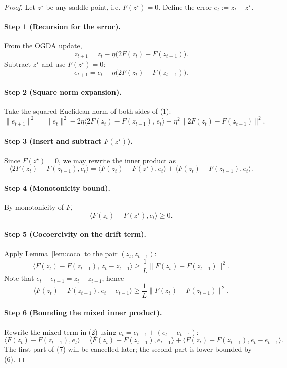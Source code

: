 \documentclass{article}
\begin{document}
\begin{proof}
Let $z^\star$ be any saddle point, i.e. $F(z^\star)=0$.  Define the error $e_t:=z_t-z^\star$.

\paragraph{Step 1 (Recursion for the error).}
From the OGDA update,
\[
z_{t+1}=z_t-\eta\bigl(2F(z_t)-F(z_{t-1})\bigr).
\]
Subtract $z^\star$ and use $F(z^\star)=0$:
\[
e_{t+1}=e_t-\eta\bigl(2F(z_t)-F(z_{t-1})\bigr).
\tag{1}
\]

\paragraph{Step 2 (Square norm expansion).}
Take the squared Euclidean norm of both sides of (1):
\[
\|e_{t+1}\|^2
= \|e_t\|^2-2\eta\bigl\langle 2F(z_t)-F(z_{t-1}),\,e_t\bigr\rangle
+\eta^2\|2F(z_t)-F(z_{t-1})\|^2.
\tag{2}
\]

\paragraph{Step 3 (Insert and subtract $F(z^\star)$).}
Since $F(z^\star)=0$, we may rewrite the inner product as
\[
\bigl\langle 2F(z_t)-F(z_{t-1}),e_t\bigr\rangle
= \bigl\langle F(z_t)-F(z^\star),e_t\bigr\rangle
+\bigl\langle F(z_t)-F(z_{t-1}),e_t\bigr\rangle .
\tag{3}
\]

\paragraph{Step 4 (Monotonicity bound).}
By monotonicity of $F$,
\[
\bigl\langle F(z_t)-F(z^\star),e_t\bigr\rangle\ge0.
\tag{4}
\]

\paragraph{Step 5 (Cocoercivity on the drift term).}
Apply Lemma~\ref{lem:coco} to the pair $(z_t,z_{t-1})$:
\[
\bigl\langle F(z_t)-F(z_{t-1}),\,z_t-z_{t-1}\bigr\rangle
\ge\frac{1}{L}\|F(z_t)-F(z_{t-1})\|^2.
\tag{5}
\]
Note that $e_t-e_{t-1}=z_t-z_{t-1}$, hence
\[
\bigl\langle F(z_t)-F(z_{t-1}),e_t-e_{t-1}\bigr\rangle
\ge\frac{1}{L}\|F(z_t)-F(z_{t-1})\|^2.
\tag{6}
\]

\paragraph{Step 6 (Bounding the mixed inner product).}
Rewrite the mixed term in (2) using $e_t=e_{t-1}+(e_t-e_{t-1})$:
\[
\bigl\langle F(z_t)-F(z_{t-1}),e_t\bigr\rangle
=\bigl\langle F(z_t)-F(z_{t-1}),e_{t-1}\bigr\rangle
+\bigl\langle F(z_t)-F(z_{t-1}),e_t-e_{t-1}\bigr\rangle .
\tag{7}
\]
The first part of (7) will be cancelled later; the second part is lower bounded by (6).


\end{proof}
\end{document}
